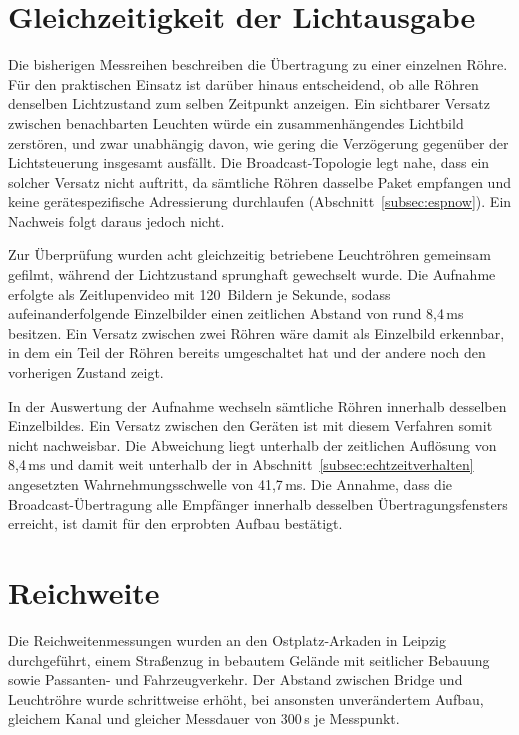 \section{Gleichzeitigkeit der Lichtausgabe}
\label{sec:gleichzeitigkeit}

Die bisherigen Messreihen beschreiben die Übertragung zu einer einzelnen Röhre.
Für den praktischen Einsatz ist darüber hinaus entscheidend, ob alle Röhren
denselben Lichtzustand zum selben Zeitpunkt anzeigen. Ein sichtbarer Versatz
zwischen benachbarten Leuchten würde ein zusammenhängendes Lichtbild zerstören,
und zwar unabhängig davon, wie gering die Verzögerung gegenüber der Lichtsteuerung
insgesamt ausfällt. Die Broadcast-Topologie legt nahe, dass ein solcher Versatz
nicht auftritt, da sämtliche Röhren dasselbe Paket empfangen und keine
gerätespezifische Adressierung durchlaufen (Abschnitt~\ref{subsec:espnow}). Ein
Nachweis folgt daraus jedoch nicht.

Zur Überprüfung wurden acht gleichzeitig betriebene Leuchtröhren gemeinsam
gefilmt, während der Lichtzustand sprunghaft gewechselt wurde. Die Aufnahme
erfolgte als Zeitlupenvideo mit 120~Bildern je Sekunde, sodass aufeinanderfolgende
Einzelbilder einen zeitlichen Abstand von rund 8,4\,ms besitzen. Ein Versatz
zwischen zwei Röhren wäre damit als Einzelbild erkennbar, in dem ein Teil der
Röhren bereits umgeschaltet hat und der andere noch den vorherigen Zustand zeigt.

In der Auswertung der Aufnahme wechseln sämtliche Röhren innerhalb desselben
Einzelbildes. Ein Versatz zwischen den Geräten ist mit diesem Verfahren somit
nicht nachweisbar. Die Abweichung liegt unterhalb der zeitlichen Auflösung von
8,4\,ms und damit weit unterhalb der in
Abschnitt~\ref{subsec:echtzeitverhalten} angesetzten Wahrnehmungsschwelle von
41,7\,ms. Die Annahme, dass die Broadcast-Übertragung alle Empfänger innerhalb
desselben Übertragungsfensters erreicht, ist damit für den erprobten Aufbau
bestätigt.

\section{Reichweite}
\label{sec:reichweitentest}

Die Reichweitenmessungen wurden an den Ostplatz-Arkaden in Leipzig durchgeführt,
einem Straßenzug in bebautem Gelände mit seitlicher Bebauung sowie Passanten- und
Fahrzeugverkehr. Der Abstand zwischen Bridge und Leuchtröhre wurde schrittweise
erhöht, bei ansonsten unverändertem Aufbau, gleichem Kanal und gleicher Messdauer
von 300\,s je Messpunkt.

